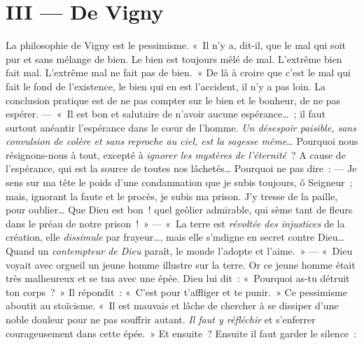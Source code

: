\documentclass[french,twoside]{book} %
\begin{document}
\section[{III — De Vigny}]{III — De Vigny}
\noindent La philosophie de Vigny est le pessimisme. « Il n’y a, dit-il, que le mal qui soit pur et sans mélange de bien. Le bien est toujours mêlé de mal. L’extrême bien fait mal. L’extrême mal ne fait pas de bien. » De là à croire que c’est le mal qui fait le fond de l’existence, le bien qui en est l’accident, il n’y a pas loin. La conclusion pratique est de ne pas compter sur le bien et le bonheur, de ne pas espérer. — « Il est bon et salutaire de n’avoir aucune espérance… ; il faut surtout anéantir l’espérance dans le cœur de l’homme. \emph{Un désespoir paisible, sans convulsion de colère et sans reproche au ciel, est la sagesse même}… Pourquoi nous résignons-nous à tout, excepté à \emph{ignorer les mystères de l’éternité} ? A cause de l’espérance, qui est la source de toutes nos lâchetés… Pourquoi ne pas dire : — Je sens sur ma tête le poids d’une condamnation que je subis toujours, ô Seigneur ; mais, ignorant la faute et le procès, je subis ma prison. J’y tresse de la paille, pour oublier… Que Dieu est bon ! quel geôlier admirable, qui sème tant de fleurs dans le préau de notre prison ! » — « La terre est \emph{révoltée des injustices} de la création, elle \emph{dissimule} par frayeur…, mais elle s’mdigne en secret contre Dieu… Quand un \emph{contempteur de Dieu} paraît, le monde l’adopte et l’aime. » — « Dieu voyait avec orgueil un jeune homme illustre sur la terre. Or ce jeune homme était très malheureux et se tua avec une épée. Dieu lui dit : « Pourquoi as-tu détruit ton corps ? » Il répondit : « C’est pour t’affliger et te punir. » Ce pessimisme aboutit au stoïcisme. « Il est mauvais et lâche de chercher à se dissiper d’une noble douleur pour ne pas souffrir autant. \emph{Il faut y réfléchir} et s’enferrer courageusement dans cette épée. » Et ensuite ? Ensuite il faut garder le silence :\par
\end{document}
